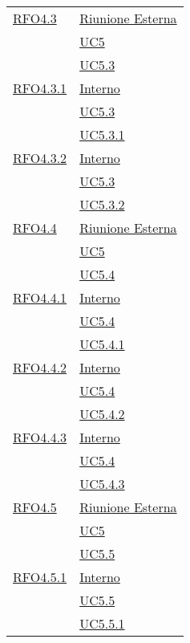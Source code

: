 \begin{longtable}{|>{\centering}m{5cm}|m{5cm}<{\centering}|}
\hyperlink{RFO4.3}{RFO4.3} & \hyperlink{Riunione Esterna}{Riunione Esterna}\\ &\hyperref[UC5]{UC5}\\ &\hyperref[UC5.3]{UC5.3}\\ \hline

\hyperlink{RFO4.3.1}{RFO4.3.1} & \hyperlink{Interno}{Interno}\\ &\hyperref[UC5.3]{UC5.3}\\ &\hyperref[UC5.3.1]{UC5.3.1}\\ \hline

\hyperlink{RFO4.3.2}{RFO4.3.2} & \hyperlink{Interno}{Interno}\\ &\hyperref[UC5.3]{UC5.3}\\ &\hyperref[UC5.3.2]{UC5.3.2}\\ \hline

\hyperlink{RFO4.4}{RFO4.4} &\hyperlink{Riunione Esterna}{Riunione Esterna}\\ &\hyperref[UC5]{UC5}\\ &\hyperref[UC5.4]{UC5.4}\\ \hline

\hyperlink{RFO4.4.1}{RFO4.4.1} &  \hyperlink{Interno}{Interno}\\ &\hyperref[UC5.4]{UC5.4}\\ &\hyperref[UC5.4.1]{UC5.4.1}\\ \hline

\hyperlink{RFO4.4.2}{RFO4.4.2} &  \hyperlink{Interno}{Interno}\\ &\hyperref[UC5.4]{UC5.4}\\ &\hyperref[UC5.4.2]{UC5.4.2}\\ \hline

\hyperlink{RFO4.4.3}{RFO4.4.3} & \hyperlink{Interno}{Interno}\\ &\hyperref[UC5.4]{UC5.4}\\ &\hyperref[UC5.4.3]{UC5.4.3}\\ \hline

\hyperlink{RFO4.5}{RFO4.5} &  \hyperlink{Riunione Esterna}{Riunione Esterna}\\ &\hyperref[UC5]{UC5}\\ &\hyperref[UC5.5]{UC5.5}\\ \hline

\hyperlink{RFO4.5.1}{RFO4.5.1} & \hyperlink{Interno}{Interno}\\ &\hyperref[UC5.5]{UC5.5}\\ &\hyperref[UC5.5.1]{UC5.5.1}\\ \hline


\end{longtable}
